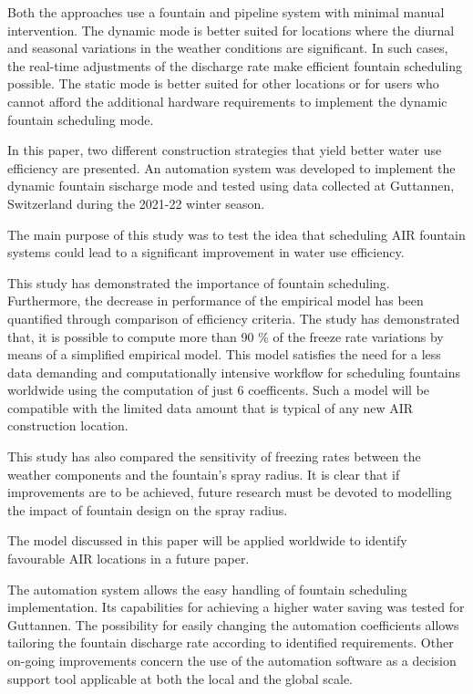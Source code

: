 \documentclass[tc, manuscript]{copernicus}
\begin{document}
Both the approaches use a fountain and pipeline system with minimal manual intervention. The dynamic mode is
better suited for locations where the diurnal and seasonal variations in the weather conditions are significant.
In such cases, the real-time adjustments of the discharge rate make efficient fountain scheduling
possible. The static mode is better suited for other locations or for users who cannot afford the additional
hardware requirements to implement the dynamic fountain scheduling mode.

\conclusions

In this paper, two different construction strategies that yield better water use efficiency are presented.
An automation system was developed to implement the dynamic fountain sischarge mode and tested using data
collected at Guttannen, Switzerland during the 2021-22 winter season. 

The main purpose of this study was to test the idea that scheduling AIR fountain systems could lead to a
significant improvement in water use efficiency.

This study has demonstrated the importance of fountain scheduling. Furthermore, the decrease in performance of
the empirical model has been quantified through comparison of efficiency criteria. The study has demonstrated
that, it is possible to compute more than 90 \% of the freeze rate variations by means of a simplified empirical
model. This model satisfies the need for a less data demanding and computationally intensive workflow for
scheduling fountains worldwide using the computation of just 6 coefficents. Such a model will be compatible with
the limited data amount that is typical of any new AIR construction location.

This study has also compared the sensitivity of freezing rates between the weather components and the fountain's
spray radius. It is clear that if improvements are to be achieved, future research must be devoted to modelling
the impact of fountain design on the spray radius.

The model discussed in this paper will be applied worldwide to identify favourable AIR locations in a future
paper.


The automation system allows the easy handling of fountain scheduling implementation. Its capabilities for
achieving a higher water saving was tested for Guttannen. The possibility for easily changing the automation
coefficients allows tailoring the fountain discharge rate according to identified requirements. Other on-going
improvements concern the use of the automation software as a decision support tool applicable at both the local
and the global scale.
\end{document}

